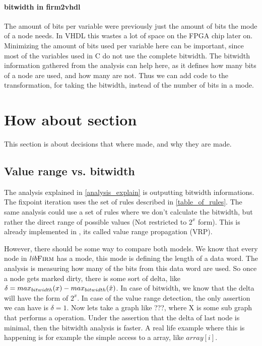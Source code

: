 \paragraph{bitwidth in firm2vhdl}
The amount of bits per variable were previously just the amount of bits the mode of a node needs. In VHDL this wastes a lot of space on the FPGA chip later on. Minimizing the amount of bits used per variable here can be important, since most of the variables used in C do not use the complete bitwidth.\newline
The bitwidth information gathered from the analysis can help here, as it defines how many bits of a node are used, and how many are not. Thus we can add code to the transformation, for taking the bitwidth, instead of the number of bits in a mode.


\section{How about section}
This section is about decisions that where made, and why they are made.

\subsection{Value range vs. bitwidth}

The analysis explained in \ref{analysis_explain} is outputting bitwidth informations. The fixpoint iteration uses the set of rules described in \autoref{table_of_rules}. The same analysis could use a set of rules where we don't calculate the bitwidth, but rather the direct range of possible values (Not restricted to $2^x$ form). This is already implemented in \libFIRM, its called value range propagation (VRP).

However, there should be some way to compare both models. We know that every node in $lib\textsc{Firm}$ has a mode, this mode is defining the length of a data word. The analysis is measuring how many of the bits from this data word are used. So once a node gets marked dirty, there is some sort of delta, like $ \delta = max _{bitwidth}(\textsc{}x) - max _{bitwidth}(\hat{x}) $.
In case of bitwidth, we know that the delta will have the form of $2^x$. In case of the value range detection, the only assertion we can have is $\delta = 1$.
Now lets take a graph like ???, where X is some sub graph that performs a operation. Under the assertion that the delta of last node is minimal, then the bitwidth analysis is faster.
A real life example where this is happening is for example the simple access to a array, like $array[i]$.




